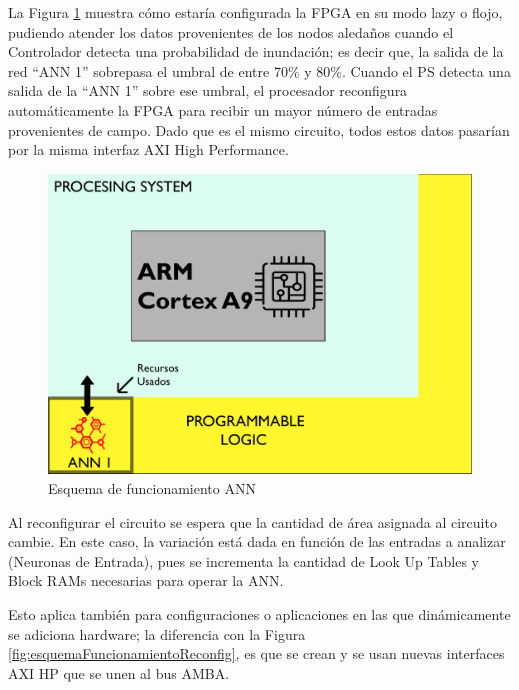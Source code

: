 La Figura \ref{fig:esquemaFuncionamiento} muestra cómo estaría configurada la FPGA en su modo lazy o flojo, pudiendo atender los datos provenientes de los nodos aledaños cuando el Controlador detecta una probabilidad de inundación; es decir que, la salida de la red ``ANN 1'' sobrepasa el umbral de entre 70\% y 80\%. Cuando el PS detecta una salida de la ``ANN 1'' sobre ese umbral, el procesador reconfigura automáticamente la FPGA para recibir un mayor número de entradas provenientes de campo. Dado que es el mismo circuito, todos estos datos pasarían por la misma interfaz AXI High Performance.

\begin{figure}[!ht]
	\centering
		\includegraphics[scale=0.5]{Figures/ANN1}
	\caption{Esquema de funcionamiento ANN}
	\label{fig:esquemaFuncionamiento}
\end{figure}

Al reconfigurar el circuito se espera que la cantidad de área asignada al circuito cambie. En este caso, la variación está dada en función de las entradas a analizar (Neuronas de Entrada), pues se incrementa la cantidad de Look Up Tables y Block RAMs necesarias para operar la ANN.

Esto aplica también para configuraciones o aplicaciones en las que dinámicamente se adiciona hardware; la diferencia con la Figura \ref{fig:esquemaFuncionamientoReconfig}, es que se crean y se usan nuevas interfaces AXI HP que se unen al bus AMBA.

